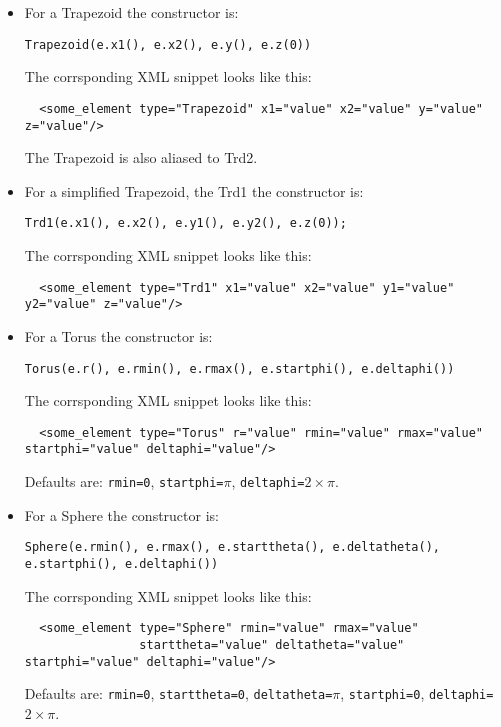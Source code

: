 \begin{itemize}
\item For a Trapezoid the constructor is:
\begin{verbatim}
Trapezoid(e.x1(), e.x2(), e.y(), e.z(0))
\end{verbatim}
The corrsponding XML snippet looks like this:
\begin{verbatim}
  <some_element type="Trapezoid" x1="value" x2="value" y="value" z="value"/>
\end{verbatim}
The Trapezoid is also aliased to Trd2.

\item For a simplified Trapezoid, the Trd1 the constructor is:
\begin{verbatim}
Trd1(e.x1(), e.x2(), e.y1(), e.y2(), e.z(0));
\end{verbatim}
The corrsponding XML snippet looks like this:
\begin{verbatim}
  <some_element type="Trd1" x1="value" x2="value" y1="value" y2="value" z="value"/>
\end{verbatim}

\item For a Torus the constructor is:
\begin{verbatim}
Torus(e.r(), e.rmin(), e.rmax(), e.startphi(), e.deltaphi())
\end{verbatim}
The corrsponding XML snippet looks like this:
\begin{verbatim}
  <some_element type="Torus" r="value" rmin="value" rmax="value" startphi="value" deltaphi="value"/>
\end{verbatim}
Defaults are: \texttt{rmin=0},  \texttt{startphi=$\pi$},  \texttt{deltaphi=$2\times\pi$}.

\item For a Sphere the constructor is:
\begin{verbatim}
Sphere(e.rmin(), e.rmax(), e.starttheta(), e.deltatheta(), e.startphi(), e.deltaphi())
\end{verbatim}
The corrsponding XML snippet looks like this:
\begin{verbatim}
  <some_element type="Sphere" rmin="value" rmax="value"
                starttheta="value" deltatheta="value" startphi="value" deltaphi="value"/>
\end{verbatim}
Defaults are: \texttt{rmin=0},  \texttt{starttheta=0},  \texttt{deltatheta=$\pi$},
\texttt{startphi=0}, \texttt{deltaphi=$2\times\pi$}.


\end{itemize}
